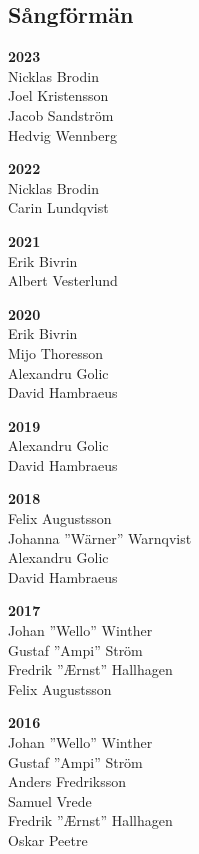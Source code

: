 \begin{flushleft}
\section{Sångförmän}
\vspace{-1em}
\end{flushleft}

{\large
\setlength{\parskip}{0.4em}
\setlength\columnsep{.5em}

\begin{multicols}{2}
\textbf{2023}\\
Nicklas Brodin\\
Joel Kristensson\\
Jacob Sandström\\
Hedvig Wennberg

\textbf{2022}\\
Nicklas Brodin\\
Carin Lundqvist

\textbf{2021}\\
Erik Bivrin\\
Albert Vesterlund

\textbf{2020}\\
Erik Bivrin\\
Mijo Thoresson\\
Alexandru Golic\\
David Hambraeus

\textbf{2019}\\
Alexandru Golic\\
David Hambraeus

\textbf{2018}\\
Felix Augustsson\\
Johanna ''Wärner'' Warnqvist\\
Alexandru Golic\\
David Hambraeus

\textbf{2017}\\
Johan ''Wello'' Winther\\
Gustaf ''Ampi'' Ström\\
Fredrik ''Ærnst'' Hallhagen\\
Felix Augustsson

\textbf{2016}\\
Johan ''Wello'' Winther\\
Gustaf ''Ampi'' Ström\\
Anders Fredriksson\\
Samuel Vrede\\
Fredrik ''Ærnst'' Hallhagen\\
Oskar Peetre


\end{multicols}}
